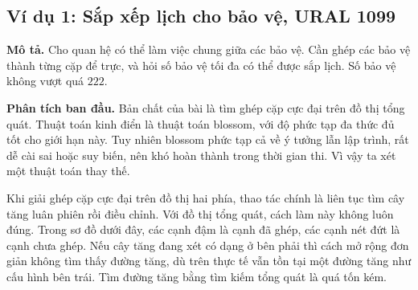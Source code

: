 \documentclass[11pt]{article}
\begin{document}
\subsection{Ví dụ 1: Sắp xếp lịch cho bảo vệ, URAL 1099}

\textbf{Mô tả.} Cho quan hệ có thể làm việc chung giữa các bảo vệ. Cần ghép
các bảo vệ thành từng cặp để trực, và hỏi số bảo vệ tối đa có thể được sắp
lịch. Số bảo vệ không vượt quá \(222\).

\textbf{Phân tích ban đầu.} Bản chất của bài là tìm ghép cặp cực đại trên đồ
thị tổng quát. Thuật toán kinh điển là thuật toán blossom, với độ phức tạp
đa thức đủ tốt cho giới hạn này. Tuy nhiên blossom phức tạp cả về ý tưởng
lẫn lập trình, rất dễ cài sai hoặc suy biến, nên khó hoàn thành trong thời
gian thi. Vì vậy ta xét một thuật toán thay thế.

Khi giải ghép cặp cực đại trên đồ thị hai phía, thao tác chính là liên tục
tìm cây tăng luân phiên rồi điều chỉnh. Với đồ thị tổng quát, cách làm này
không luôn đúng. Trong sơ đồ dưới đây, các cạnh đậm là cạnh đã ghép, các cạnh
nét đứt là cạnh chưa ghép. Nếu cây tăng đang xét có dạng ở bên phải thì cách
mở rộng đơn giản không tìm thấy đường tăng, dù trên thực tế vẫn tồn tại một
đường tăng như cấu hình bên trái. Tìm đường tăng bằng tìm kiếm tổng quát là
quá tốn kém.

\begin{center}
\end{center}
\end{document}
